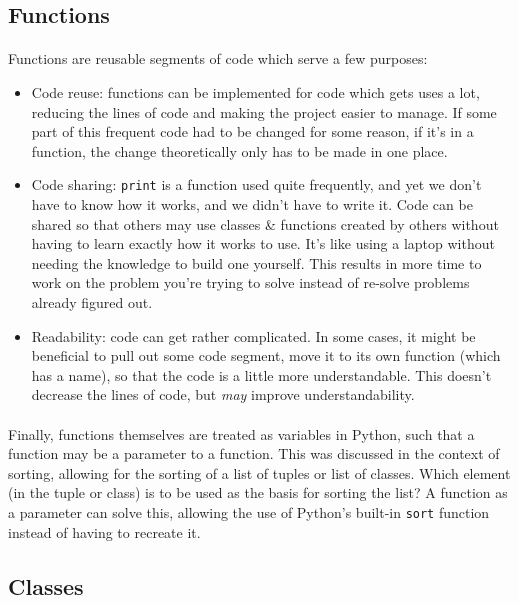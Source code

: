 \documentclass[letter,10pt]{article}
\begin{document}
\subsection{Functions}
\paragraph{}Functions are reusable segments of code which serve a few purposes:
\begin{itemize}
    \item Code reuse: functions can be implemented for code which gets uses a lot, reducing the lines of code and making the project easier to manage. If some part of this frequent code had to be changed for some reason, if it's in a function, the change theoretically only has to be made in one place.
    \item Code sharing: \verb|print| is a function used quite frequently, and yet we don't have to know how it works, and we didn't have to write it. Code can be shared so that others may use classes \& functions created by others without having to learn exactly how it works to use. It's like using a laptop without needing the knowledge to build one yourself. This results in more time to work on the problem you're trying to solve instead of re-solve problems already figured out.
    \item Readability: code can get rather complicated. In some cases, it might be beneficial to pull out some code segment, move it to its own function (which has a name), so that the code is a little more understandable. This doesn't decrease the lines of code, but \textit{may} improve understandability.
\end{itemize}

\paragraph{}Finally, functions themselves are treated as variables in Python, such that a function may be a parameter to a function. This was discussed in the context of sorting, allowing for the sorting of a list of tuples or list of classes. Which element (in the tuple or class) is to be used as the basis for sorting the list? A function as a parameter can solve this, allowing the use of Python's built-in \verb|sort| function instead of having to recreate it.

\subsection{Classes}\label{sec:classes}
\end{document}
